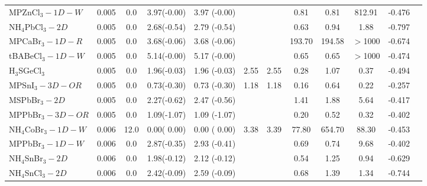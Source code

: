 \begin{table*}
\begin{tabular*}{0.98\textwidth}{@{\extracolsep{\fill}}l c c c c c c c c c c c}
     MPZnCl$_3-1D-W$&      0.005&        0.0&       3.97(-0.00)&            3.97  (-0.00)&           &                &            0.81&            0.81&          812.91&     -0.476\\
   NH$_4$PbCl$_3-2D$&      0.005&        0.0&       2.68(-0.54)&            2.79  (-0.54)&           &                &            0.63&            0.94&            1.88&     -0.797\\
     MPCaBr$_3-1D-R$&      0.005&        0.0&       3.68(-0.06)&            3.68  (-0.06)&           &                &          193.70&          194.58&         $>$1000&     -0.674\\
    tBABeCl$_3-1D-W$&      0.005&        0.0&       5.14(-0.00)&            5.17  (-0.00)&           &                &            0.65&            0.65&         $>$1000&     -0.474\\
      H$_3$SGeCl$_3$&      0.005&        0.0&       1.96(-0.03)&            1.96  (-0.03)&       2.55&            2.55&            0.28&            1.07&            0.37&     -0.494\\
     MPSnI$_3-3D-OR$&      0.005&        0.0&       0.73(-0.30)&            0.73  (-0.30)&       1.18&            1.18&            0.16&            0.64&            0.22&     -0.257\\
       MSPbBr$_3-2D$&      0.005&        0.0&       2.27(-0.62)&            2.47  (-0.56)&           &                &            1.41&            1.88&            5.64&     -0.417\\
    MPPbBr$_3-3D-OR$&      0.005&        0.0&       1.09(-1.07)&            1.09  (-1.07)&           &                &            0.20&            0.52&            0.32&     -0.402\\
 NH$_4$CoBr$_3-1D-W$&      0.006&       12.0&       0.00( 0.00)&            0.00  ( 0.00)&       3.38&            3.39&           77.80&          654.70&           88.30&     -0.453\\
     MPPbBr$_3-1D-W$&      0.006&        0.0&       2.87(-0.35)&            2.93  (-0.41)&           &                &            0.69&            0.74&            9.68&     -0.402\\
   NH$_4$SnBr$_3-2D$&      0.006&        0.0&       1.98(-0.12)&            2.12  (-0.12)&           &                &            0.54&            1.25&            0.94&     -0.629\\
   NH$_4$SnCl$_3-2D$&      0.006&        0.0&       2.42(-0.09)&            2.59  (-0.09)&           &                &            0.68&            1.39&            1.34&     -0.744\\
   \hline 
    \end{tabular*}
 \end{table*}
